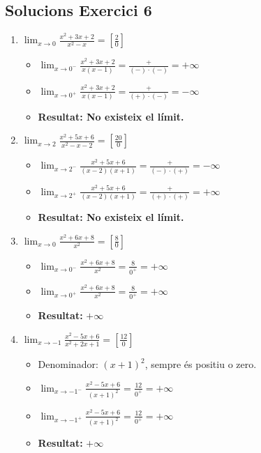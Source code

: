 \documentclass[12pt,a4paper]{article}
\begin{document}
\subsection*{Solucions Exercici 6}
\begin{enumerate}[label=6.\arabic*.]
    \item $\displaystyle \lim_{x \to 0} \frac{x^2+3x+2}{x^2-x} = \left[ \frac{2}{0} \right]$
    \begin{itemize}
        \item $\displaystyle \lim_{x \to 0^-} \frac{x^2+3x+2}{x(x-1)} = \frac{+}{(-)\cdot(-)} = +\infty$
        \item $\displaystyle \lim_{x \to 0^+} \frac{x^2+3x+2}{x(x-1)} = \frac{+}{(+)\cdot(-)} = -\infty$
        \item \textbf{Resultat: No existeix el límit.}
    \end{itemize}

    \item $\displaystyle \lim_{x \to 2} \frac{x^2+5x+6}{x^2-x-2} = \left[ \frac{20}{0} \right]$
    \begin{itemize}
        \item $\displaystyle \lim_{x \to 2^-} \frac{x^2+5x+6}{(x-2)(x+1)} = \frac{+}{(-)\cdot(+)} = -\infty$
        \item $\displaystyle \lim_{x \to 2^+} \frac{x^2+5x+6}{(x-2)(x+1)} = \frac{+}{(+)\cdot(+)} = +\infty$
        \item \textbf{Resultat: No existeix el límit.}
    \end{itemize}

    \item $\displaystyle \lim_{x \to 0} \frac{x^2+6x+8}{x^2} = \left[ \frac{8}{0} \right]$
    \begin{itemize}
        \item $\displaystyle \lim_{x \to 0^-} \frac{x^2+6x+8}{x^2} = \frac{8}{0^+} = +\infty$
        \item $\displaystyle \lim_{x \to 0^+} \frac{x^2+6x+8}{x^2} = \frac{8}{0^+} = +\infty$
        \item \textbf{Resultat: } $\mathbf{+\infty}$
    \end{itemize}

    \item $\displaystyle \lim_{x \to -1} \frac{x^2-5x+6}{x^2+2x+1} = \left[ \frac{12}{0} \right]$
    \begin{itemize}
        \item Denominador: $(x+1)^2$, sempre és positiu o zero.
        \item $\displaystyle \lim_{x \to -1^-} \frac{x^2-5x+6}{(x+1)^2} = \frac{12}{0^+} = +\infty$
        \item $\displaystyle \lim_{x \to -1^+} \frac{x^2-5x+6}{(x+1)^2} = \frac{12}{0^+} = +\infty$
        \item \textbf{Resultat: } $\mathbf{+\infty}$
    \end{itemize}


\end{enumerate}
\end{document}
